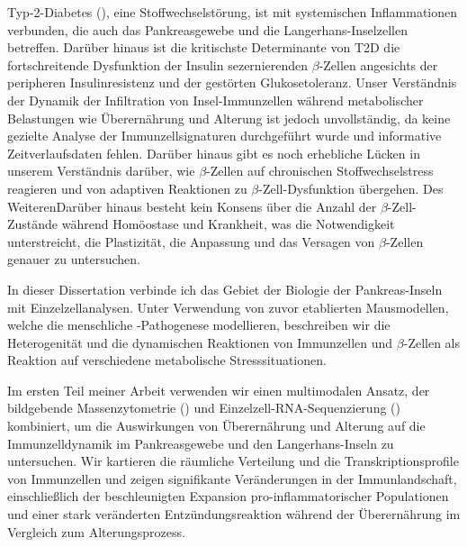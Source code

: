 \begin{zusammen}
\vspace{0.5cm}
\par Typ-2-Diabetes (), eine Stoffwechselstörung, ist mit systemischen Inflammationen verbunden, die auch das Pankreasgewebe und die Langerhans-Inselzellen betreffen. Darüber hinaus ist die kritischste Determinante von T2D die fortschreitende Dysfunktion der Insulin sezernierenden $\beta$-Zellen angesichts der peripheren Insulinresistenz und der gestörten Glukosetoleranz. Unser Verständnis der Dynamik der Infiltration von Insel-Immunzellen während metabolischer Belastungen wie Überernährung und Alterung ist jedoch unvollständig, da keine gezielte Analyse der Immunzellsignaturen durchgeführt wurde und informative Zeitverlaufsdaten fehlen. Darüber hinaus gibt es noch erhebliche Lücken in unserem Verständnis darüber, wie $\beta$-Zellen auf chronischen Stoffwechselstress reagieren und von adaptiven Reaktionen zu $\beta$-Zell-Dysfunktion übergehen. Des WeiterenDarüber hinaus besteht kein Konsens über die Anzahl der $\beta$-Zell-Zustände während Homöostase und Krankheit, was die Notwendigkeit unterstreicht, die Plastizität, die Anpassung und das Versagen von $\beta$-Zellen genauer zu untersuchen.\\

\par In dieser Dissertation verbinde ich das Gebiet der Biologie der Pankreas-Inseln mit Einzelzellanalysen. Unter Verwendung von zuvor etablierten Mausmodellen, welche die menschliche -Pathogenese modellieren, beschreiben wir die Heterogenität und die dynamischen Reaktionen von Immunzellen und $\beta$-Zellen als Reaktion auf verschiedene metabolische Stresssituationen.\\

\par Im ersten Teil meiner Arbeit verwenden wir einen multimodalen Ansatz, der bildgebende Massenzytometrie () und Einzelzell-RNA-Sequenzierung () kombiniert, um die Auswirkungen von Überernährung und Alterung auf die Immunzelldynamik im Pankreasgewebe und den Langerhans-Inseln zu untersuchen. Wir kartieren die räumliche Verteilung und die Transkriptionsprofile von Immunzellen und zeigen signifikante Veränderungen in der Immunlandschaft, einschließlich der beschleunigten Expansion pro-inflammatorischer Populationen und einer stark veränderten Entzündungsreaktion während der Überernährung im Vergleich zum Alterungsprozess.\\


\end{zusammen}
